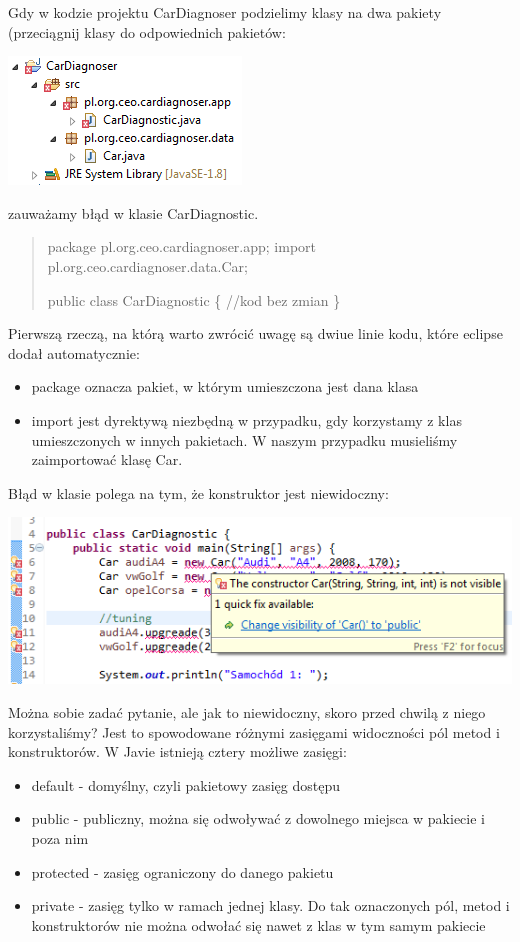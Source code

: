 \documentclass[letterpaper,10pt,english]{sphinxmanual}
\begin{document}
Gdy w kodzie projektu CarDiagnoser podzielimy klasy na dwa pakiety (przeciągnij klasy do odpowiednich pakietów:

{\hfill\includegraphics{package.png}\hfill}

zauważamy błąd w klasie CarDiagnostic.
\begin{quote}

package pl.org.ceo.cardiagnoser.app;
import pl.org.ceo.cardiagnoser.data.Car;

public class CarDiagnostic \{
//kod bez zmian
\}
\end{quote}

Pierwszą rzeczą, na którą warto zwrócić uwagę są dwiue linie kodu, które eclipse dodał automatycznie:
\begin{itemize}
\item {} 
package oznacza pakiet, w którym umieszczona jest dana klasa

\item {} 
import jest dyrektywą niezbędną w przypadku, gdy korzystamy z klas umieszczonych w innych pakietach. W naszym przypadku musieliśmy zaimportować klasę Car.

\end{itemize}

Błąd w klasie polega na tym, że konstruktor jest niewidoczny:

{\hfill\includegraphics{constructor.png}\hfill}

Można sobie zadać pytanie, ale jak to niewidoczny, skoro przed chwilą z niego korzystaliśmy? Jest to spowodowane różnymi zasięgami widoczności pól metod i konstruktorów. W Javie istnieją cztery możliwe zasięgi:
\begin{itemize}
\item {} 
default - domyślny, czyli pakietowy zasięg dostępu

\item {} 
public - publiczny, można się odwoływać z dowolnego miejsca w pakiecie i poza nim

\item {} 
protected - zasięg ograniczony do danego pakietu

\item {} 
private - zasięg tylko w ramach jednej klasy. Do tak oznaczonych pól, metod i konstruktorów nie można odwołać się nawet z klas w tym samym pakiecie

\end{itemize}
\end{document}
